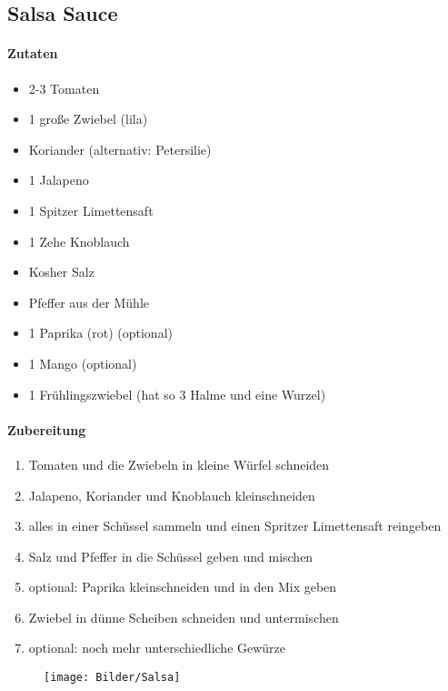 \newpage
\subsection{Salsa Sauce}
\paragraph{Zutaten}
\begin{itemize}[noitemsep]
	\item 2-3 Tomaten
	\item 1 große Zwiebel (lila)
	\item Koriander (alternativ: Petersilie) 
	\item 1 Jalapeno 
	\item 1 Spitzer Limettensaft
	\item 1 Zehe Knoblauch
	\item Kosher Salz
	\item Pfeffer aus der Mühle
	\item 1 Paprika (rot) (optional)
	\item 1 Mango (optional)
	\item 1 Frühlingszwiebel (hat so 3 Halme und eine Wurzel)
\end{itemize}
\paragraph{Zubereitung}
\begin{enumerate}[noitemsep]
	\item Tomaten und die Zwiebeln in kleine Würfel schneiden
	\item Jalapeno, Koriander und Knoblauch kleinschneiden
	\item alles in einer Schüssel sammeln und einen Spritzer Limettensaft reingeben 
	\item Salz und Pfeffer in die Schüssel geben und mischen 
	\item optional: Paprika kleinschneiden und in den Mix geben
	\item Zwiebel in dünne Scheiben schneiden und untermischen
	\item optional: noch mehr unterschiedliche Gewürze
\end{enumerate}
\begin{figure}[h]
\centering
\texttt{[image: Bilder/Salsa]}
\end{figure}